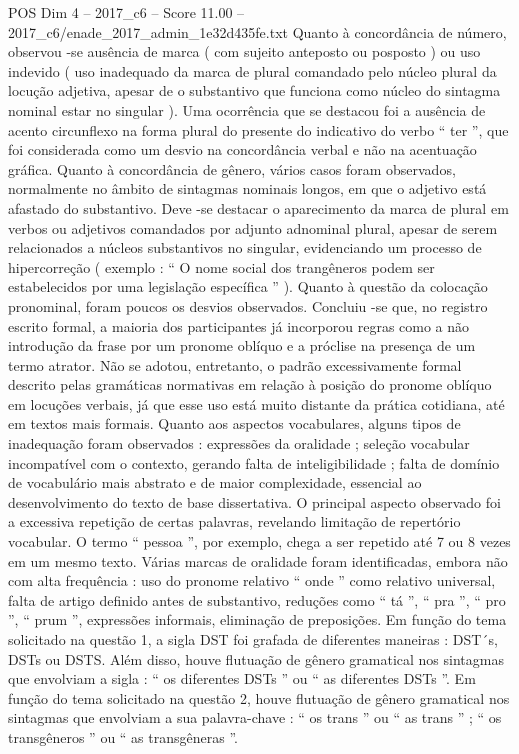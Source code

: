 \begin{textsample}{POS Dim 4 – 2017\_c6 – Score 11.00 – 2017\_c6/enade\_2017\_admin\_1e32d435fe.txt}
Quanto à concordância de número, observou -se ausência de marca ( com sujeito anteposto ou posposto ) ou uso indevido ( uso inadequado da marca de plural comandado pelo núcleo plural da locução adjetiva, apesar de o substantivo que funciona como núcleo do sintagma nominal estar no singular ).
Uma ocorrência que se destacou foi a ausência de acento circunflexo na forma plural do presente do indicativo do verbo “ ter ”, que foi considerada como um desvio na concordância verbal e não na acentuação gráfica.
Quanto à concordância de gênero, vários casos foram observados, normalmente no âmbito de sintagmas nominais longos, em que o adjetivo está afastado do substantivo.
Deve -se destacar o aparecimento da marca de plural em verbos ou adjetivos comandados por adjunto adnominal plural, apesar de serem relacionados a núcleos substantivos no singular, evidenciando um processo de hipercorreção ( exemplo : “ O nome social dos trangêneros podem ser estabelecidos por uma legislação específica ” ).
Quanto à questão da colocação pronominal, foram poucos os desvios observados.
Concluiu -se que, no registro escrito formal, a maioria dos participantes já incorporou regras como a não introdução da frase por um pronome oblíquo e a próclise na presença de um termo atrator.
Não se adotou, entretanto, o padrão excessivamente formal descrito pelas gramáticas normativas em relação à posição do pronome oblíquo em locuções verbais, já que esse uso está muito distante da prática cotidiana, até em textos mais formais.
Quanto aos aspectos vocabulares, alguns tipos de inadequação foram observados : expressões da oralidade ; seleção vocabular incompatível com o contexto, gerando falta de inteligibilidade ; falta de domínio de vocabulário mais abstrato e de maior complexidade, essencial ao desenvolvimento do texto de base dissertativa.
O principal aspecto observado foi a excessiva repetição de certas palavras, revelando limitação de repertório vocabular.
O termo “ pessoa ”, por exemplo, chega a ser repetido até 7 ou 8 vezes em um mesmo texto.
Várias marcas de oralidade foram identificadas, embora não com alta frequência : uso do pronome relativo “ onde ” como relativo universal, falta de artigo definido antes de substantivo, reduções como “ tá ”, “ pra ”, “ pro ”, “ prum ”, expressões informais, eliminação de preposições.
Em função do tema solicitado na questão 1, a sigla DST foi grafada de diferentes maneiras : DST´s, DSTs ou DSTS.
Além disso, houve flutuação de gênero gramatical nos sintagmas que envolviam a sigla : “ os diferentes DSTs ” ou “ as diferentes DSTs ”.
Em função do tema solicitado na questão 2, houve flutuação de gênero gramatical nos sintagmas que envolviam a sua palavra-chave : “ os trans ” ou “ as trans ” ; “ os transgêneros ” ou “ as transgêneras ”.

\end{textsample}
